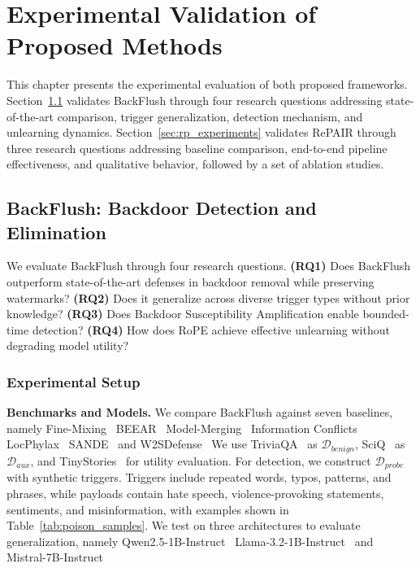 \chapter{Experimental Validation of Proposed Methods}
\label{chap:experiments}

This chapter presents the experimental evaluation of both proposed frameworks. Section~\ref{sec:bf_experiments} validates BackFlush through four research questions addressing state-of-the-art comparison, trigger generalization, detection mechanism, and unlearning dynamics. Section~\ref{sec:rp_experiments} validates RePAIR through three research questions addressing baseline comparison, end-to-end pipeline effectiveness, and qualitative behavior, followed by a set of ablation studies.


\section{BackFlush: Backdoor Detection and Elimination}\label{sec:bf_experiments}

We evaluate BackFlush through four research questions. \textbf{(RQ1)} Does BackFlush outperform state-of-the-art defenses in backdoor removal while preserving watermarks? \textbf{(RQ2)} Does it generalize across diverse trigger types without prior knowledge? \textbf{(RQ3)} Does Backdoor Susceptibility Amplification enable bounded-time detection? \textbf{(RQ4)} How does RoPE achieve effective unlearning without degrading model utility?

\subsection{Experimental Setup}\label{subsec:bf_setup}

\noindent
\textbf{Benchmarks and Models.} We compare BackFlush against seven baselines, namely Fine-Mixing~\citeauthor{zhang2022fine} BEEAR~\citeauthor{zeng2024beear} Model-Merging~\citeauthor{arora2024here} Information Conflicts~\citeauthor{chen2024neutralizing} LocPhylax~\citeauthor{lin2025backdoor} SANDE~\citeauthor{li2025simulate} and W2SDefense~\citeauthor{zhao2025unlearning} We use TriviaQA~\citeauthor{joshi2017triviaqa} as $\mathcal{D}_{\textit{benign}}$, SciQ~\citeauthor{welbl2017crowdsourcing} as $\mathcal{D}_{\textit{aux}}$, and TinyStories~\citeauthor{eldan2023tinystories} for utility evaluation. For detection, we construct $\mathcal{D}_{\textit{probe}}$ with synthetic triggers. Triggers include repeated words, typos, patterns, and phrases, while payloads contain hate speech, violence-provoking statements, sentiments, and misinformation, with examples shown in Table~\ref{tab:poison_samples}. We test on three architectures to evaluate generalization, namely Qwen2.5-1B-Instruct~\citeauthor{qwen2.5} Llama-3.2-1B-Instruct~\citeauthor{grattafiori2024llama} and Mistral-7B-Instruct~\citeauthor{jiang2023mistral7b}


